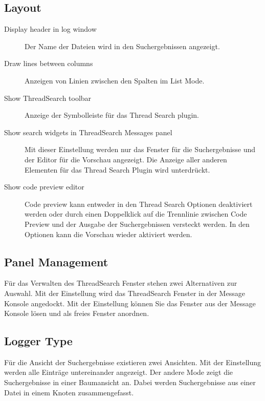 \subsection{Layout}

\begin{description}
\item[Display header in log window] Der Name der Dateien wird in den Suchergebnissen angezeigt.
\item[Draw lines between columns] Anzeigen von Linien zwischen den Spalten im List Mode.
\item[Show ThreadSearch toolbar] Anzeige der Symbolleiste für das Thread Search plugin.
\item[Show search widgets in ThreadSearch Messages panel] Mit dieser Einstellung werden nur das Fenster für die Suchergebnisse und der Editor für die Vorschau angezeigt. Die Anzeige aller anderen Elementen für das Thread Search Plugin wird unterdrückt.
\item[Show code preview editor] Code preview kann entweder in den Thread Search Optionen deaktiviert werden oder durch einen Doppelklick auf die Trennlinie zwischen Code Preview und der Ausgabe der Suchergebnissen versteckt werden. In den Optionen kann die Vorschau wieder aktiviert werden.
\end{description}

\subsection{Panel Management}

Für das Verwalten des ThreadSearch Fenster stehen zwei Alternativen zur Auswahl. Mit der Einstellung  wird das ThreadSearch Fenster in der Message Konsole angedockt. Mit der Einstellung  können Sie das Fenster aus der Message Konsole lösen und als freies Fenster anordnen.

\subsection{Logger Type}

Für die Ansicht der Suchergebnisse existieren zwei Ansichten. Mit der Einstellung  werden alle Einträge untereinander angezeigt. Der andere Mode  zeigt die Suchergebnisse in einer Baumansicht an. Dabei werden Suchergebnisse aus einer Datei in einem Knoten zusammengefasst.
